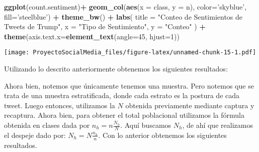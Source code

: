 \documentclass[
]{article}
\newenvironment{Shaded}{\begin{snugshade}}{\end{snugshade}}
\newcommand{\DataTypeTok}[1]{\textcolor[rgb]{0.13,0.29,0.53}{#1}}
\newcommand{\DecValTok}[1]{\textcolor[rgb]{0.00,0.00,0.81}{#1}}
\newcommand{\KeywordTok}[1]{\textcolor[rgb]{0.13,0.29,0.53}{\textbf{#1}}}
\newcommand{\NormalTok}[1]{#1}
\newcommand{\OperatorTok}[1]{\textcolor[rgb]{0.81,0.36,0.00}{\textbf{#1}}}
\newcommand{\StringTok}[1]{\textcolor[rgb]{0.31,0.60,0.02}{#1}}
\begin{document}
\begin{Shaded}
\begin{Highlighting}[]
\KeywordTok{ggplot}\NormalTok{(count.sentiment)}\OperatorTok{+}
\StringTok{  }\KeywordTok{geom_col}\NormalTok{(}\KeywordTok{aes}\NormalTok{(}\DataTypeTok{x =}\NormalTok{ class, }\DataTypeTok{y =}\NormalTok{ n), }\DataTypeTok{color=}\StringTok{'skyblue'}\NormalTok{, }\DataTypeTok{fill=}\StringTok{'steelblue'}\NormalTok{) }\OperatorTok{+}\StringTok{ }
\StringTok{  }\KeywordTok{theme_bw}\NormalTok{() }\OperatorTok{+}\StringTok{ }
\StringTok{  }\KeywordTok{labs}\NormalTok{(}
    \DataTypeTok{title =} \StringTok{"Conteo de Sentimientos de Tweets de Trump"}\NormalTok{,}
    \DataTypeTok{x =} \StringTok{"Tipo de Sentimiento"}\NormalTok{,}
    \DataTypeTok{y =} \StringTok{"Conteo"}
\NormalTok{  ) }\OperatorTok{+}
\StringTok{  }\KeywordTok{theme}\NormalTok{(}\DataTypeTok{axis.text.x=}\KeywordTok{element_text}\NormalTok{(}\DataTypeTok{angle=}\DecValTok{45}\NormalTok{, }\DataTypeTok{hjust=}\DecValTok{1}\NormalTok{))}
\end{Highlighting}
\end{Shaded}

\texttt{[image: ProyectoSocialMedia\_files/figure-latex/unnamed-chunk-15-1.pdf]}

Utilizando lo descrito anteriormente obtenemos los siguientes
resultados:

Ahora bien, notemos que únicamente tenemos una muestra. Pero notemos que
se trata de una muestra estratificada, donde cada estrato es la postura
de cada tweet. Luego entonces, utilizamos la \(N\) obtenida previamente
mediante captura y recaptura. Ahora bien, para obtener el total
poblacional utilizamos la fórmula obtenida en clases dada por
\(n_h = n \frac{N_h}{N}\). Aquí buscamos \(N_h\), de ahí que realizamos
el despeje dado por: \(N_h = N \frac{n_h}{n}\). Con lo anterior
obtenemos los siguientes resultados.

\begin{Shaded}
\end{Shaded}
\end{document}
